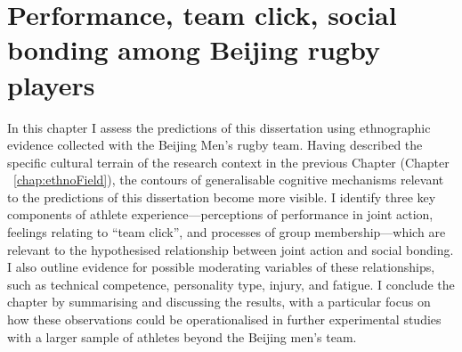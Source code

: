\chapter{\label{chap:ethnoResults} Performance, team click, social bonding among Beijing rugby players}

\minitoc



In this chapter I assess the predictions of this dissertation using ethnographic evidence collected with the Beijing Men's rugby team.  Having described the specific cultural terrain of the research context in the previous Chapter (Chapter ~\ref{chap:ethnoField}), the contours of generalisable cognitive mechanisms relevant to the predictions of this dissertation become more visible. I identify three key components of athlete experience---perceptions of performance in joint action, feelings relating to ``team click'', and processes of group membership---which are relevant to the hypothesised relationship between joint action and social bonding.  I also outline evidence for possible moderating variables of these relationships, such as technical competence, personality type, injury, and fatigue.  I conclude the chapter by summarising and discussing the results, with a particular focus on how these observations could be operationalised in further experimental studies with a larger sample of athletes beyond the Beijing men's team.



